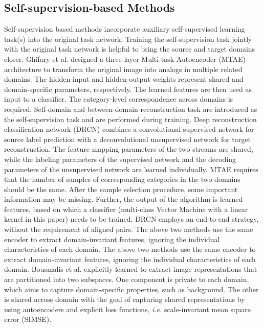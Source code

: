 \documentclass[conference]{IEEEtran}
\begin{document}
\subsection{Self-supervision-based Methods}
Self-supervision based methods incorporate auxiliary self-supervised learning task(s) 
into the original task network.
Training the self-supervision task jointly with the original task network
is helpful to bring the source and target domains closer.
Ghifary et al. designed a three-layer Multi-task Autoencoder (MTAE) architecture
to transform the original image into analogs in multiple related domains.
The hidden-input and hidden-output weights represent shared and domain-specific
parameters, respectively. 
The learned features are then used as input to a classifier. 
The category-level correspondence across domains is required. 
Self-domain and between-domain reconstruction task are introduced as the self-supervision
task and are performed during training.
Deep reconstruction classification network (DRCN) combines a convolutional
supervised network for source label prediction with a deconvolutional unsupervised 
network for target reconstruction. 
The feature mapping parameters of the two streams are shared, while the labeling 
parameters of the supervised network and the decoding parameters of the unsupervised 
network are learned individually.
MTAE requires that the number of samples of corresponding categories
in the two domains should be the same. 
After the sample selection procedure, some important information may be missing.
Further, the output of the algorithm is learned features, based on 
which a classifier (multi-class Vector Machine with a linear kernel in this paper)
needs to be trained.
DRCN employs an end-to-end strategy, without the requirement of aligned pairs.
The above two methods use the same encoder to extract domain-invariant features, 
ignoring the individual characteristics of each domain.
The above two methods use the same encoder to extract domain-invariant features,
ignoring the individual characteristics of each domain. 
Bousmalis et al. explicitly learned to extract image representations that are 
partitioned into two subspaces. 
One component is private to each domain, which aims to capture domain-specific
properties, such as background.
The other is shared across domain with the goal of capturing shared representations 
by using autoencoders and explicit loss functions, \textit{i.e.} scale-invariant
mean square error (SIMSE).
\end{document}

